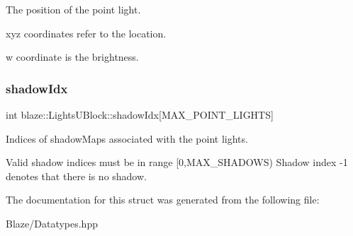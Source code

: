 The position of the point light. 

\begin{DoxyItemize}
\item xyz coordinates refer to the location. \item w coordinate is the brightness. \end{DoxyItemize}
\mbox{\label{structblaze_1_1LightsUBlock_a2678f626f12d1fc23e8ec2aaa23cbbdc}} 
\subsubsection{\texorpdfstring{shadow\+Idx}{shadowIdx}}
{\footnotesize\ttfamily int blaze\+::\+Lights\+U\+Block\+::shadow\+Idx\mbox{[}M\+A\+X\+\_\+\+P\+O\+I\+N\+T\+\_\+\+L\+I\+G\+H\+TS\mbox{]}}



Indices of shadow\+Maps associated with the point lights. 

Valid shadow indices must be in range \mbox{[}0,M\+A\+X\+\_\+\+S\+H\+A\+D\+O\+WS) Shadow index -\/1 denotes that there is no shadow. 

The documentation for this struct was generated from the following file\+:\begin{DoxyCompactItemize}
\item 
Blaze/Datatypes.\+hpp\end{DoxyCompactItemize}
